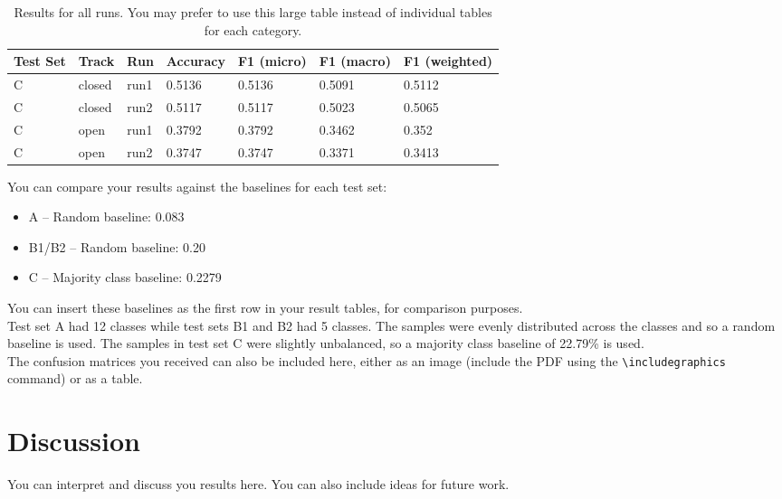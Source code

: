\documentclass[11pt]{article}
\begin{document}
\begin{table}[h]
\center
\begin{tabular}{|lllllll|}
\hline
\bf Test Set & \bf Track & \bf Run & \bf Accuracy & \bf F1 (micro) & \bf F1 (macro) & \bf F1 (weighted) \\ 
\hline

C & closed & run1 & 0.5136 & 0.5136 & 0.5091 & 0.5112 \\
C & closed & run2 & 0.5117 & 0.5117 & 0.5023 & 0.5065 \\
C & open & run1 & 0.3792 & 0.3792 & 0.3462 & 0.352 \\
C & open & run2 & 0.3747 & 0.3747 & 0.3371 & 0.3413 \\
\hline
\end{tabular}
\caption{Results for all runs. You may prefer to use this large table instead of individual tables for each category.}
\label{tab:results-all}
\end{table}

You can compare your results against the baselines for each test set:

\begin{itemize}
\item A -- Random baseline: 0.083
\item B1/B2 -- Random baseline: 0.20
\item C -- Majority class baseline: 0.2279
\end{itemize}

You can insert these baselines as the first row in your result tables, for comparison purposes.
\\

Test set A had 12 classes while test sets B1 and B2 had 5 classes. The samples were evenly distributed across the classes and so a random baseline is used.
The samples in test set C were slightly unbalanced, so a majority class baseline of 22.79\% is used.
\\

The confusion matrices you received can also be included here, either as an image (include the PDF using the  \verb|\includegraphics| command) or as a table.

\clearpage %

\section{Discussion}

You can interpret and discuss you results here. You can also include ideas for future work.



\end{document}
